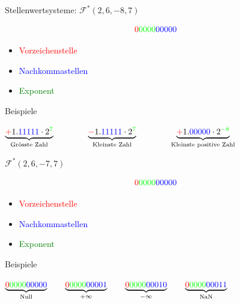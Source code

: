 \ifnum\conditionmacro=1 \documentclass[handout,usenames,dvipsnames]{beamer}\fi
\begin{document}
\begin{frame}{Stellenwertsysteme: $\mathcal{F}^\ast(2,6,-8,7)$}
\begin{Huge}
\[{\color{red}{0}}{\color{green}{0000}}{\color{blue}{00000}}\]
\end{Huge}
\begin{itemize}
\item\textcolor{red}{Vorzeichenstelle}
\item\textcolor{blue}{Nachkommastellen}
\item\textcolor{green}{Exponent}
\end{itemize}
\begin{block}{Beispiele}

$\underbrace{\textcolor{red}{+}1.\textcolor{blue}{11111}\cdot 2^{\textcolor{green}{7}}}_\text{Grösste Zahl}\qquad\qquad \underbrace{\textcolor{red}{-}1.\textcolor{blue}{11111}\cdot2^{\textcolor{green}{7}}}_\text{Kleinste Zahl}\qquad\qquad\underbrace{\textcolor{red}{+}1.\textcolor{blue}{00000}\cdot2^{\textcolor{green}{-8}}}_\text{Kleinste positive Zahl}$

\end{block}
\end{frame}

\begin{frame}{$\mathcal{F}^\ast(2,6,-7,7)$}
\begin{Huge}
\[{\color{red}{0}}{\color{green}{0000}}{\color{blue}{00000}}\]
\end{Huge}
\begin{itemize}
\item\textcolor{red}{Vorzeichenstelle}
\item\textcolor{blue}{Nachkommastellen}
\item\textcolor{green}{Exponent}
\end{itemize}
\begin{block}{Beispiele}
\begin{center}
$\underbrace{\textcolor{red}{0}\textcolor{green}{0000}\textcolor{blue}{00000}}_\text{Null}\qquad \underbrace{\textcolor{red}{0}\textcolor{green}{0000}\textcolor{blue}{00001}}_{+\infty}\qquad\underbrace{\textcolor{red}{0}\textcolor{green}{0000}\textcolor{blue}{00010}}_{-\infty}\qquad\underbrace{\textcolor{red}{0}\textcolor{green}{0000}\textcolor{blue}{00011}}_\text{NaN}$
\end{center}
\end{block}
\end{frame}
\end{document}
